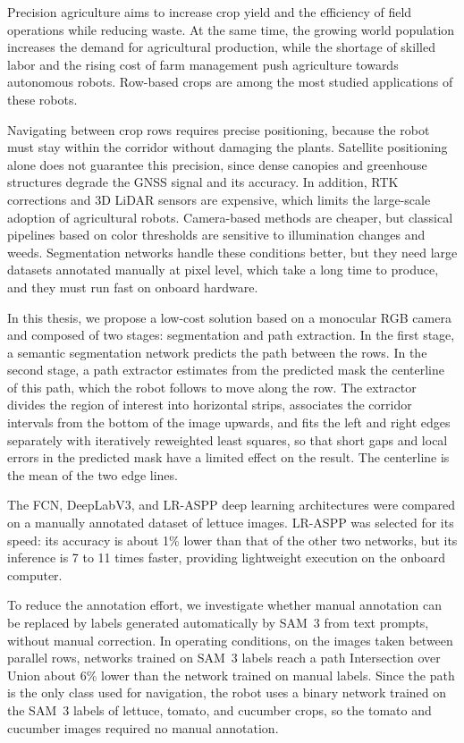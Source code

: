 Precision agriculture aims to increase crop yield and the efficiency of field operations while reducing waste. At the same time, the growing world population increases the demand for agricultural production, while the shortage of skilled labor and the rising cost of farm management push agriculture towards autonomous robots. Row-based crops are among the most studied applications of these robots.

Navigating between crop rows requires precise positioning, because the robot must stay within the corridor without damaging the plants. Satellite positioning alone does not guarantee this precision, since dense canopies and greenhouse structures degrade the GNSS signal and its accuracy. In addition, RTK corrections and 3D LiDAR sensors are expensive, which limits the large-scale adoption of agricultural robots. Camera-based methods are cheaper, but classical pipelines based on color thresholds are sensitive to illumination changes and weeds. Segmentation networks handle these conditions better, but they need large datasets annotated manually at pixel level, which take a long time to produce, and they must run fast on onboard hardware.

In this thesis, we propose a low-cost solution based on a monocular RGB camera and composed of two stages: segmentation and path extraction. In the first stage, a semantic segmentation network predicts the path between the rows. In the second stage, a path extractor estimates from the predicted mask the centerline of this path, which the robot follows to move along the row. The extractor divides the region of interest into horizontal strips, associates the corridor intervals from the bottom of the image upwards, and fits the left and right edges separately with iteratively reweighted least squares, so that short gaps and local errors in the predicted mask have a limited effect on the result. The centerline is the mean of the two edge lines.

The FCN, DeepLabV3, and LR-ASPP deep learning architectures were compared on a manually annotated dataset of lettuce images. LR-ASPP was selected for its speed: its accuracy is about 1\% lower than that of the other two networks, but its inference is 7 to 11 times faster, providing lightweight execution on the onboard computer.

To reduce the annotation effort, we investigate whether manual annotation can be replaced by labels generated automatically by SAM~3 from text prompts, without manual correction. In operating conditions, on the images taken between parallel rows, networks trained on SAM~3 labels reach a path Intersection over Union about 6\% lower than the network trained on manual labels. Since the path is the only class used for navigation, the robot uses a binary network trained on the SAM~3 labels of lettuce, tomato, and cucumber crops, so the tomato and cucumber images required no manual annotation.

